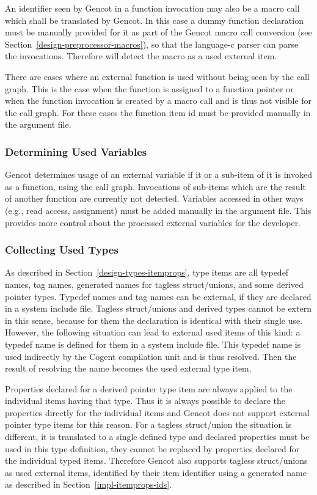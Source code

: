 An identifier seen by Gencot in a function invocation may also be a macro call which shall be translated by Gencot. 
In this case a dummy function declaration must be manually provided for it as part of the Gencot macro call conversion
(see Section~\ref{design-preprocessor-macros}), so that the language-c parser can parse the invocations. 
Therefore  will detect the macro as a used external item.

There are cases where an external function is used without being seen by the call graph. This is the case when
the function is assigned to a function pointer or when the function invocation is created by a macro call and
is thus not visible for the call graph. For these cases the function item id must be provided manually in the argument file.

\subsubsection{Determining Used Variables}

Gencot determines usage of an external variable if it or a sub-item of it is invoked as a function, using the 
call graph. Invocations of sub-items which are the result of another function are currently not detected. 
Variables accessed in other ways (e.g., read access, assignment) must be added manually in the argument file. This
provides more control about the processed external variables for the developer.

\subsubsection{Collecting Used Types}

As described in Section~\ref{design-types-itemprops}, type items are all typedef names, tag names, generated names 
for tagless struct/unions, and some derived pointer types. Typedef names and tag names can be external, if they are 
declared in a system include file. Tagless struct/unions and derived types cannot be extern in this sense, because 
for them the declaration is identical with their single use. However, the following situation can lead to external 
used items of this kind: a typedef name is defined for them in a system include file. This typedef name is used 
indirectly by the Cogent compilation unit and is thus resolved. Then the result of resolving the name becomes the 
used external type item. 

Properties declared for a derived pointer type item are always applied to the individual items having that type. 
Thus it is always possible to declare the properties directly for the individual items and Gencot does not support 
external pointer type items for this reason. For a tagless struct/union the situation is different, it is translated
to a single defined type and declared properties must be used in this type definition, they cannot be replaced by
properties declared for the individual typed items. Therefore Gencot also supports tagless struct/unions as used
external items, identified by their item identifier using a generated name as described in Section~\ref{impl-itemprops-ids}.


